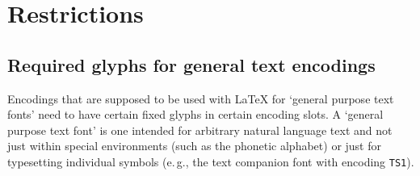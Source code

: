 \documentclass{ltxguide}[1994/11/20]
\providecommand{\Enc}[1]{\texttt{#1}}
\begin{document}
\section{Restrictions}
\label{sec:restrictions}


\subsection{Required glyphs for general text encodings}

Encodings that are supposed to be used with \LaTeX{} for `general
purpose text fonts' need to have certain fixed glyphs in certain
encoding slots.  A `general purpose text font' is one intended for
arbitrary natural language text and not just within special
environments (such as the phonetic alphabet) or just for typesetting
individual symbols (e.\,g., the text companion font with encoding
\Enc{TS1}).
\end{document}
